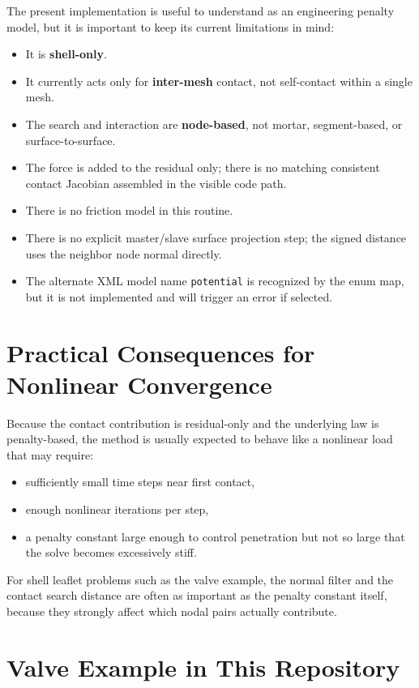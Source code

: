 \documentclass[11pt]{article}
\begin{document}
The present implementation is useful to understand as an engineering penalty model, but it is important to keep its current limitations in mind:
\begin{itemize}[leftmargin=*]
\item It is \textbf{shell-only}.
\item It currently acts only for \textbf{inter-mesh} contact, not self-contact within a single mesh.
\item The search and interaction are \textbf{node-based}, not mortar, segment-based, or surface-to-surface.
\item The force is added to the residual only; there is no matching consistent contact Jacobian assembled in the visible code path.
\item There is no friction model in this routine.
\item There is no explicit master/slave surface projection step; the signed distance uses the neighbor node normal directly.
\item The alternate XML model name \texttt{potential} is recognized by the enum map, but it is not implemented and will trigger an error if selected.
\end{itemize}

\section{Practical Consequences for Nonlinear Convergence}

Because the contact contribution is residual-only and the underlying law is penalty-based, the method is usually expected to behave like a nonlinear load that may require:
\begin{itemize}[leftmargin=*]
\item sufficiently small time steps near first contact,
\item enough nonlinear iterations per step,
\item a penalty constant large enough to control penetration but not so large that the solve becomes excessively stiff.
\end{itemize}

For shell leaflet problems such as the valve example, the normal filter and the contact search distance are often as important as the penalty constant itself, because they strongly affect which nodal pairs actually contribute.

\section{Valve Example in This Repository}
\end{document}
